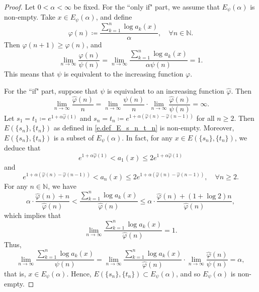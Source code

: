 \documentclass[12pt,reqno]{amsart}
\renewcommand{\=}{\coloneqq}
\theoremstyle{plain}
\begin{document}
\begin{proof}
Let $0<\alpha<\infty$ be fixed.
        For the ``only if" part, we assume that $E_{\psi}(\alpha)$ is non-empty. Take $x\in E_{\psi}(\alpha)$, and define
        \begin{equation*}
            \varphi(n)\coloneqq \frac{\sum^n_{k=1}\log a_k(x)}{\alpha},\quad \forall n \in\mathbb N.
        \end{equation*}
        Then $\varphi(n+1)\geq \varphi(n)$, and
        \begin{equation*}
                \lim_{n\to \infty}\frac{\varphi(n)}{\psi(n)}
                =\lim_{n\to \infty}\frac
                {\sum^n_{k=1}\log a_k(x)}{\alpha\psi(n)}
                =1.
        \end{equation*}
        This means that $\psi$ is equivalent to the increasing function $\varphi$.


For the ``if" part, suppose that $\psi$ is equivalent to an increasing function $\widehat{\varphi}$. Then
        \begin{equation*}
                \lim_{n\to \infty}\frac{\widehat{\varphi}(n)}{n}=
                \lim_{n\to \infty}\frac{\psi(n)}{n}\cdot
                \lim_{n\to \infty}\frac{\widehat{\varphi}(n)}{\psi(n)}=\infty.
        \end{equation*}
Let $s_1=t_1\coloneqq e^{1+\alpha\widehat{\varphi}(1)}$ and $s_n=t_n\coloneqq e^{1+\alpha(\widehat{\varphi}(n)-\widehat{\varphi}(n-1))}$ for all $n \geq 2$. Then $E(\{s_n\},\{t_n\})$ as defined in \eqref{e.def_E_s_n_t_n} is non-empty. Moreover, $E(\{s_n\},\{t_n\})$ is a subset of $E_\psi(\alpha)$. In fact, for any $x\in E(\{s_n\},\{t_n\})$, we deduce that
\[
e^{1+\alpha\widehat{\varphi}(1)} < a_1(x) \leq 2e^{1+\alpha\widehat{\varphi}(1)}
\]
and
\begin{equation*}\label{e.estimation_a_n}
                e^{1+\alpha(\widehat{\varphi}(n)-\widehat{\varphi}(n-1))}
                <{a_n}(x)
                \leq
                2e^{1+\alpha(\widehat{\varphi}(n)-\widehat{\varphi}(n-1))},\quad \forall n \geq 2.
        \end{equation*}
For any $n \in \mathbb N$, we have
\begin{equation*}
 \alpha \cdot\frac{\widehat{\varphi}(n)+n}
                {\widehat{\varphi}(n)}
               <
                \frac{\sum^n_{k=1}\log a_k(x)}{\widehat{\varphi}(n)}
                \leq
                \alpha \cdot\frac{\widehat{\varphi}(n)+(1+\log2)n}
                {\widehat{\varphi}(n)},
        \end{equation*}
which implies that
\[
\lim_{n\to \infty}  \frac{\sum^n_{k=1}\log a_k(x)}{\widehat{\varphi}(n)}=1.
\]
Thus,
\begin{equation*}
                \lim_{n\to \infty}\frac{\sum^n_{k=1}\log a_k(x)}{\psi(n)}
                =\lim_{n\to \infty}\frac{\sum^n_{k=1}\log a_k(x)}{\widehat{\varphi}(n)} \cdot \lim_{n\to \infty}\frac{\widehat{\varphi}(n)}{\psi(n)}
                =\alpha,
        \end{equation*}
that is, $x\in E_{\psi}(\alpha)$. Hence, $E(\{s_n\},\{t_n\}) \subset E_{\psi}(\alpha)$, and so $E_\psi(\alpha)$ is non-empty.
\end{proof}
\end{document}
